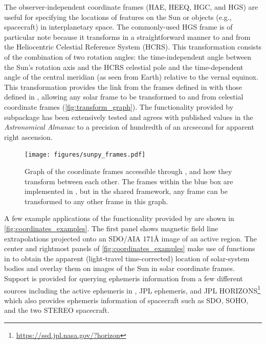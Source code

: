 The observer-independent coordinate frames (HAE, HEEQ, HGC, and HGS) are useful for specifying the locations of features on the Sun or objects (e.g., spacecraft) in interplanetary space.
The commonly-used HGS frame is of particular note because it transforms in a straightforward manner to and from the Heliocentric Celestial Reference System (HCRS).
This transformation consists of the combination of two rotation angles: the time-independent angle between the Sun's rotation axis and the HCRS celestial pole \citep[see][]{2007CeMDA..98..155S} and the time-dependent angle of the central meridian (as seen from Earth) relative to the vernal equinox.
This transformation provides the link from the frames defined in  with those defined in , allowing any solar frame to be transformed to and from celestial coordinate frames (\autoref{fig:transform_graph}).
The functionality provided by   subpackage has been extensively tested and agrees with published values in the \textit{Astronomical Almanac} to a precision of hundredth of an arcsecond for apparent right ascension.

\begin{figure}
    \centering
    \texttt{[image: figures/sunpy\_frames.pdf]}
    \caption{Graph of the coordinate frames accessible through , and how they transform between each other.
    The frames within the blue box are implemented in , but in the shared framework, any frame can be transformed to any other frame in this graph.}
    \label{fig:transform_graph}
\end{figure}

A few example applications of the functionality provided by  are shown in \autoref{fig:coordinates_examples}. 
The first panel shows magnetic field line extrapolations projected onto an SDO/AIA 171\AA{} image of an active region.
The center and rightmost panels of \autoref{fig:coordinates_examples} make use of functions in  to obtain the apparent (light-travel time-corrected) location of solar-system bodies and overlay them on images of the Sun in solar coordinate frames.
Support is  provided for querying ephemeris information from a few different sources including the active ephemeris in , JPL ephemeris, and JPL HORIZONS\footnote{\url{https://ssd.jpl.nasa.gov/?horizon}} which also provides ephemeris information of spacecraft such as SDO, SOHO, and the two STEREO spacecraft.

